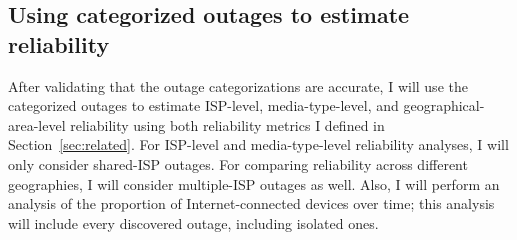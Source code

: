 \subsection{Using categorized outages to estimate reliability}

After validating that the outage categorizations are accurate, I will
use the categorized outages to estimate ISP-level, media-type-level,
and geographical-area-level reliability using both reliability metrics
I defined in Section~\ref{sec:related}. For ISP-level and
media-type-level reliability analyses, I will only consider shared-ISP
outages. For comparing reliability across different geographies, I will consider multiple-ISP outages as
well. Also, I will perform an analysis of the proportion of
Internet-connected devices over time; this analysis will include every
discovered outage, including isolated ones.




